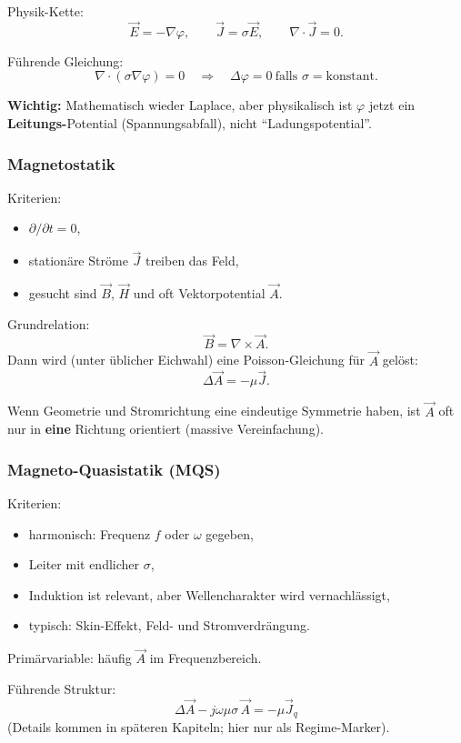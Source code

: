 \documentclass[a4paper]{article}
\newcommand{\imp}[1]{{\color{accent}\bfseries #1}}
\newcommand{\E}{\vec E}
\newcommand{\Hf}{\vec H}
\newcommand{\B}{\vec B}
\newcommand{\J}{\vec J}
\newcommand{\A}{\vec A}
\begin{document}
Physik-Kette:
\[
\E = -\nabla\varphi,\qquad \J=\sigma\E,\qquad \nabla\cdot \J = 0.
\]

Führende Gleichung:
\[
\nabla\cdot(\sigma\nabla\varphi)=0
\quad\Rightarrow\quad
\Delta\varphi=0\ \text{falls }\sigma=\text{konstant}.
\]

\begin{merke}
\imp{Wichtig:} Mathematisch wieder Laplace, aber physikalisch ist $\varphi$ jetzt ein \imp{Leitungs-}Potential (Spannungsabfall), nicht ``Ladungspotential''.
\end{merke}

\subsubsection{Magnetostatik}
Kriterien:
\begin{itemize}
  \item $\partial/\partial t=0$,
  \item stationäre Ströme $\J$ treiben das Feld,
  \item gesucht sind $\B$, $\Hf$ und oft Vektorpotential $\A$.
\end{itemize}

Grundrelation:
\[
\B=\nabla\times \A.
\]
Dann wird (unter üblicher Eichwahl) eine Poisson-Gleichung für $\A$ gelöst:
\[
\Delta \A = -\mu \J.
\]

\begin{checkitem}
Wenn Geometrie und Stromrichtung eine eindeutige Symmetrie haben, ist $\A$ oft nur in \imp{eine} Richtung orientiert (massive Vereinfachung).
\end{checkitem}

\subsubsection{Magneto-Quasistatik (MQS)}
Kriterien:
\begin{itemize}
  \item harmonisch: Frequenz $f$ oder $\omega$ gegeben,
  \item Leiter mit endlicher $\sigma$,
  \item Induktion ist relevant, aber Wellencharakter wird vernachlässigt,
  \item typisch: Skin-Effekt, Feld- und Stromverdrängung.
\end{itemize}

Primärvariable: häufig $\A$ im Frequenzbereich.

Führende Struktur:
\[
\Delta \A - j\omega\mu\sigma\,\A = -\mu \J_q
\]
(Details kommen in späteren Kapiteln; hier nur als Regime-Marker).
\end{document}
